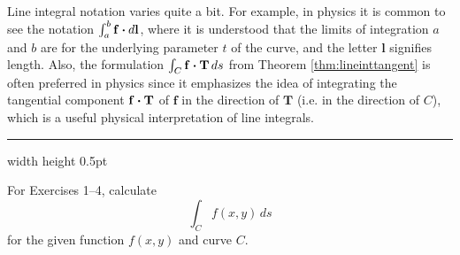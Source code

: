Line integral notation varies quite a bit. For example, in physics it is common to see the notation
$\int_a^b \mathbf{f} \bm{\cdot} d\mathbf{l}$, where it is understood that the limits of integration $a$ and $b$ are for
the underlying parameter $t$ of the curve, and the letter $\mathbf{l}$ signifies length. Also, the formulation
$\int_C \mathbf{f} \bm{\cdot} \mathbf{T}\,ds$ from Theorem \ref{thm:lineinttangent} is often preferred in physics since
it emphasizes the idea of integrating the tangential component $\mathbf{f} \bm{\cdot} \mathbf{T}$ of $\mathbf{f}$ in the
direction of $\mathbf{T}$ (i.e. in the direction of $C$), which is a useful physical interpretation of line integrals.
\hrule width \textwidth height 0.5pt
\medskip
\centerline{}\label{sec4dot1}
\par\noindent For Exercises 1--4, calculate 
\[\int_C f(x,y)\,ds\] for the given function $f(x,y)$ and
curve $C$.
